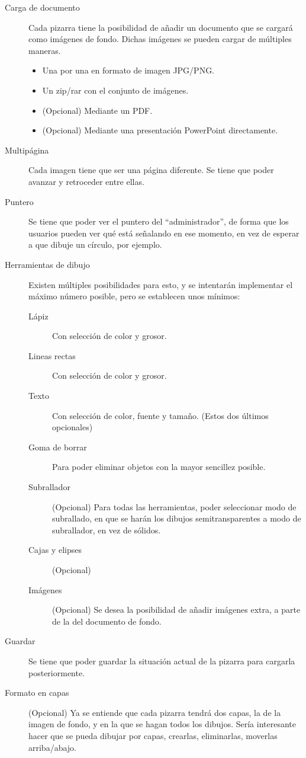 \begin{description}
	\item[Carga de documento] Cada pizarra tiene la posibilidad de añadir un documento que se cargará como imágenes de fondo. Dichas imágenes se pueden cargar de múltiples maneras.
	\begin{itemize}
		\item Una por una en formato de imagen JPG/PNG.
		\item Un zip/rar con el conjunto de imágenes.
		\item (Opcional) Mediante un PDF.
		\item (Opcional) Mediante una presentación PowerPoint directamente.
	\end{itemize}
	\item[Multipágina] Cada imagen tiene que ser una página diferente. Se tiene que poder avanzar y retroceder entre ellas.
	\item[Puntero] Se tiene que poder ver el puntero del ``administrador'', de forma que los usuarios pueden ver qué está señalando en ese momento, en vez de esperar a que dibuje un círculo, por ejemplo.
	\item[Herramientas de dibujo] Existen múltiples posibilidades para esto, y se intentarán implementar el máximo número posible, pero se establecen unos mínimos:
	\begin{description}
		\item[Lápiz] Con selección de color y grosor.
		\item[Lineas rectas] Con selección de color y grosor.
		\item[Texto] Con selección de color, fuente y tamaño. (Estos dos últimos opcionales)
		\item[Goma de borrar] Para poder eliminar objetos con la mayor sencillez posible.
		\item[Subrallador] (Opcional) Para todas las herramientas, poder seleccionar modo de subrallado, en que se harán los dibujos semitransparentes a modo de subrallador, en vez de sólidos.
		\item[Cajas y elipses] (Opcional)
		\item[Imágenes] (Opcional) Se desea la posibilidad de añadir imágenes extra, a parte de la del documento de fondo.
	\end{description}
	\item[Guardar] Se tiene que poder guardar la situación actual de la pizarra para cargarla posteriormente.
	\item[Formato en capas] (Opcional) Ya se entiende que cada pizarra tendrá dos capas, la de la imagen de fondo, y en la que se hagan todos los dibujos. Sería interesante hacer que se pueda dibujar por capas, crearlas, eliminarlas, moverlas arriba/abajo.

\end{description}
